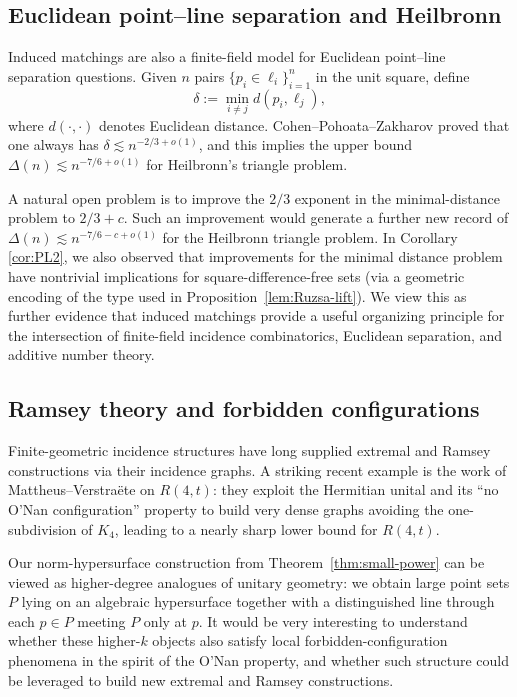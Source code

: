 \documentclass[12pt,reqno]{amsart}
\theoremstyle{plain}
\theoremstyle{definition}
\newcommand{\1}{\mathbf{1}}
\begin{document}
\subsection*{Euclidean point--line separation and Heilbronn}

Induced matchings are also a finite-field model for Euclidean point--line separation questions.
Given $n$ pairs $\{p_i\in \ell_i\}_{i=1}^n$ in the unit square, define
\[
  \delta := \min_{i\neq j} d(p_i,\ell_j),
\]
where $d(\cdot,\cdot)$ denotes Euclidean distance.
Cohen--Pohoata--Zakharov \cite{CPZ} proved that one always has $\delta\lesssim n^{-2/3+o(1)}$,
and this implies the upper bound $\Delta(n)\lesssim n^{-7/6+o(1)}$ for Heilbronn's triangle problem.

A natural open problem is to improve the $2/3$ exponent in the minimal-distance problem to $2/3+c$.
Such an improvement would generate a further new record of $\Delta(n) \lesssim n^{-7/6-c+o(1)}$ for the Heilbronn triangle problem. In Corollary \ref{cor:PL2}, we also observed that improvements for the minimal distance problem have nontrivial implications for square-difference-free sets (via a geometric encoding of the type used in Proposition~\ref{lem:Ruzsa-lift}). We view this as further evidence that induced matchings provide a useful organizing principle for the intersection of finite-field incidence combinatorics, Euclidean separation, and additive number theory.

\subsection*{Ramsey theory and forbidden configurations}

Finite-geometric incidence structures have long supplied extremal and Ramsey constructions via their incidence graphs. A striking recent example is the work of Mattheus--Verstra\"ete \cite{MV} on $R(4,t)$:
they exploit the Hermitian unital and its ``no O'Nan configuration'' property to build very dense graphs
avoiding the one-subdivision of $K_4$, leading to a nearly sharp lower bound for $R(4,t)$.

Our norm-hypersurface construction from Theorem~\ref{thm:small-power} can be viewed as higher-degree analogues of unitary geometry: we obtain large point sets $P$ lying on an algebraic hypersurface together with a distinguished line through each $p\in P$ meeting $P$ only at $p$.  It would be very interesting to understand whether these higher-$k$ objects also satisfy local forbidden-configuration phenomena in the spirit of the O'Nan property, and whether such structure could be leveraged to build new extremal and Ramsey constructions.
\end{document}

